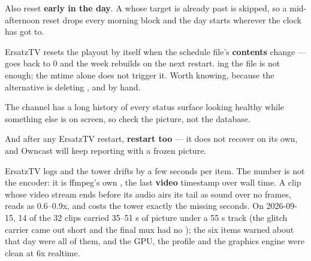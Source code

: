 \documentclass[fontpath=fonts/,logopath=logo/]{riposte-doc}
\begin{document}
Also reset \textbf{early in the day}. A  whose target is already past is skipped, so a mid-afternoon reset drops every morning block and the day starts wherever the clock has got to.



ErsatzTV resets the playout by itself when the schedule file's \textbf{contents} change —  goes back to 0 and the week rebuilds on the next restart. ing the file is not enough; the mtime alone does not trigger it. Worth knowing, because the alternative is deleting ,  and  by hand.



The channel has a long history of every status surface looking healthy while something else is on screen, so check the picture, not the database.

\ripcodeopen
{}
\ripcodesizereset\ripcodeclose

And after any ErsatzTV restart, \textbf{restart  too} — it does not recover on its own, and Owncast will keep reporting  with a frozen picture.



ErsatzTV logs  and the tower drifts by a few seconds per item. The number is not the encoder: it is ffmpeg's own , the last \textbf{video} timestamp over wall time. A clip whose video stream ends before its audio airs its tail as sound over no frames, reads as 0.6--0.9x, and costs the tower exactly the missing seconds. On 2026-09-15, 14 of the 32  clips carried 35--51 s of picture under a 55 s  track (the glitch carrier came out short and the final mux had no ); the six items warned about that day were all of them, and the GPU, the profile and the graphics engine were clean at 6x realtime.
\end{document}
